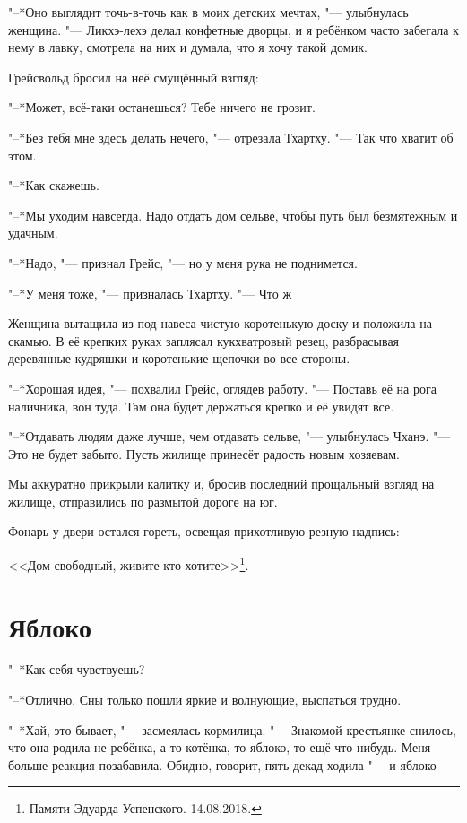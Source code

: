 \documentclass[a4paper,10pt]{book}
\newcommand{\ldotst}{\so{...}\xspace}
\begin{document}
"--*Оно выглядит точь-в-точь как в моих детских мечтах, "--- улыбнулась женщина. "--- Ликхэ-лехэ делал конфетные дворцы, и я ребёнком часто забегала к нему в лавку, смотрела на них и думала, что я хочу такой домик.

Грейсвольд бросил на неё смущённый взгляд:

"--*Может, всё-таки останешься? Тебе ничего не грозит.

"--*Без тебя мне здесь делать нечего, "--- отрезала Тхартху. "--- Так что хватит об этом.

"--*Как скажешь.

"--*Мы уходим навсегда. Надо отдать дом сельве, чтобы путь был безмятежным и удачным.

"--*Надо, "--- признал Грейс, "--- но у меня рука не поднимется.

"--*У меня тоже, "--- призналась Тхартху. "--- Что ж\ldotst

Женщина вытащила из-под навеса чистую коротенькую доску и положила на скамью. В её крепких руках заплясал кукхватровый резец, разбрасывая деревянные кудряшки и коротенькие щепочки во все стороны.

"--*Хорошая идея, "--- похвалил Грейс, оглядев работу. "--- Поставь её на рога наличника, вон туда. Там она будет держаться крепко и её увидят все.

"--*Отдавать людям даже лучше, чем отдавать сельве, "--- улыбнулась Чханэ. "--- Это не будет забыто. Пусть жилище принесёт радость новым хозяевам.

Мы аккуратно прикрыли калитку и, бросив последний прощальный взгляд на жилище, отправились по размытой дороге на юг.

Фонарь у двери остался гореть, освещая прихотливую резную надпись:

<<Дом свободный, живите кто хотите>>\footnote{Памяти Эдуарда Успенского. 14.08.2018.}.
 
 \section{Яблоко}

"--*Как себя чувствуешь?

"--*Отлично. Сны только пошли яркие и волнующие, выспаться трудно.

"--*Хай, это бывает, "--- засмеялась кормилица. "--- Знакомой крестьянке снилось, что она родила не ребёнка, а то котёнка, то яблоко, то ещё что-нибудь.
Меня больше реакция позабавила. Обидно, говорит, пять декад ходила "--- и яблоко\ldotst
 
\end{document}
